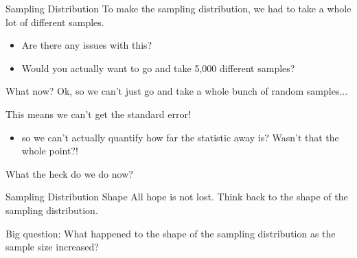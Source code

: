 \documentclass{beamer}
\begin{document}
\begin{frame}{Sampling Distribution}
To make the sampling distribution, we had to take a whole lot of different samples.
\begin{itemize}
    \item Are there any issues with this?
    \item Would you actually want to go and take 5,000 different samples?
\end{itemize}
\end{frame}

\begin{frame}{What now?}
Ok, so we can't just go and take a whole bunch of random samples... \vspace{10mm}

This means we can't get the standard error!
\begin{itemize}
    \item so we can't actually quantify how far the statistic away is? Wasn't that the whole point?!
\end{itemize} \vspace{10mm}

What the heck do we do now?
\end{frame}

\begin{frame}{Sampling Distribution Shape}
All hope is not lost. Think back to the shape of the sampling distribution. \vspace{15mm}

Big question: What happened to the shape of the sampling distribution as the sample size increased?
\end{frame}
\end{document}
